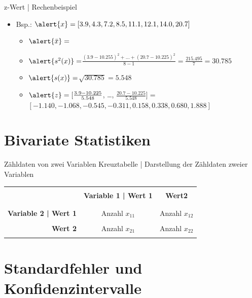\begin{frame}
  {z-Wert | Rechenbeispiel}
  \begin{itemize}[<+->]
    \item Bsp.: $\alert{x}=[3.9, 4.3, 7.2, 8.5, 11.1, 12.1, 14.0, 20.7]$
      \Halbzeile
      \begin{itemize}[<+->]
        \item $\alert{\bar{x}}=$
          \Halbzeile
        \item $\alert{s^2(x)}=$$\frac{(3.9-10.255)^2+\ldots+(20.7-10.225)^2}{8-1}=$$\frac{215.495}{7}=$$30.785$
          \Halbzeile
        \item $\alert{s(x)}=$$\sqrt{30.785}=$$5.548$
          \Halbzeile
        \item $\alert{z}=[\frac{3.9-10.225}{5.548}$, \ldots, $\frac{20.7-10.225}{5.548}]=$$[-1.140, -1.068, -0.545, -0.311, 0.158, 0.338, 0.680, 1.888]$
      \end{itemize}
  \end{itemize}
\end{frame}

\section{Bivariate Statistiken}

\begin{frame}
  {Zähldaten von zwei Variablen}
  \alert{Kreuztabelle} | Darstellung der Zähldaten zweier Variablen\\
  \Zeile
  \begin{center}
    \begin{tabular}{rcc}
      \cline{2-3}
      &&\\
      & \textbf{Variable 1 | Wert 1} & \textbf{Wert2} \\
      &&\\
      \hline
      &&\\
      \textbf{Variable 2 | Wert 1} & Anzahl $x_{11}$ & Anzahl $x_{12}$ \\
      &&\\
      \textbf{Wert 2} & Anzahl $x_{21}$ & Anzahl $x_{22}$ \\
      &&\\
      \hline
    \end{tabular}
  \end{center}
\end{frame}



\section{Standardfehler und Konfidenzintervalle}

